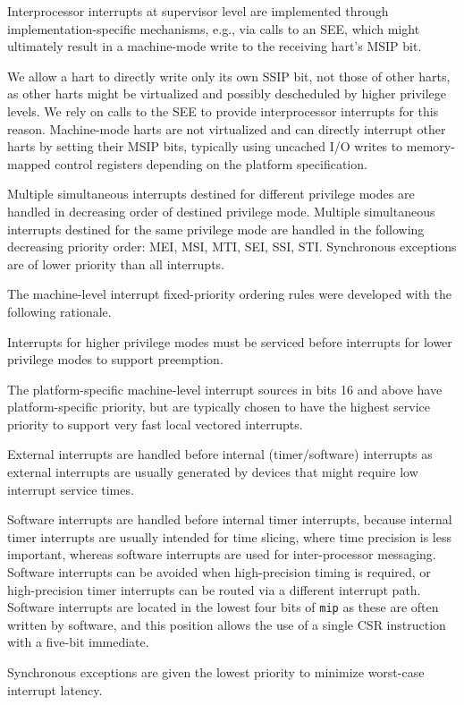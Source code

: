 \begin{commentary}
Interprocessor
interrupts at supervisor level are implemented through
implementation-specific mechanisms, e.g., via calls to an SEE,
which might ultimately result in
a machine-mode write to the receiving hart's MSIP bit.

We allow a hart to directly write only its own SSIP bit, not those of other
harts, as other harts might be
virtualized and possibly descheduled by higher privilege levels.  We
rely on calls to the SEE to provide interprocessor interrupts
for this reason.  Machine-mode harts are not virtualized and can
directly interrupt other harts by setting their MSIP bits, typically
using uncached I/O writes to memory-mapped control registers depending
on the platform specification.
\end{commentary}

Multiple simultaneous interrupts destined for different privilege modes are
handled in decreasing order of destined privilege mode.  Multiple simultaneous
interrupts destined for the same privilege mode are handled in the following
decreasing priority order: MEI, MSI, MTI, SEI, SSI, STI.
Synchronous exceptions are of lower priority than all interrupts.

\begin{commentary}
  The machine-level interrupt fixed-priority ordering rules were developed
  with the following rationale.
  
  Interrupts for higher privilege modes must be serviced before
  interrupts for lower privilege modes to support preemption.

  The platform-specific machine-level interrupt sources in bits 16 and above
  have platform-specific priority, but are typically chosen to have the
  highest service priority to support very fast local vectored interrupts.

  External interrupts are handled before internal (timer/software)
  interrupts as external interrupts are usually generated by devices
  that might require low interrupt service times.

  Software interrupts are handled before internal timer interrupts,
  because internal timer interrupts are usually intended for time
  slicing, where time precision is less important, whereas software
  interrupts are used for inter-processor messaging.  Software
  interrupts can be avoided when high-precision timing is required, or
  high-precision timer interrupts can be routed via a different
  interrupt path.
  Software interrupts are located in the lowest four bits of {\tt mip}
  as these are often written by software, and this position allows the
  use of a single CSR instruction with a five-bit immediate.

  Synchronous exceptions are given the lowest priority to minimize
  worst-case interrupt latency.
\end{commentary}

